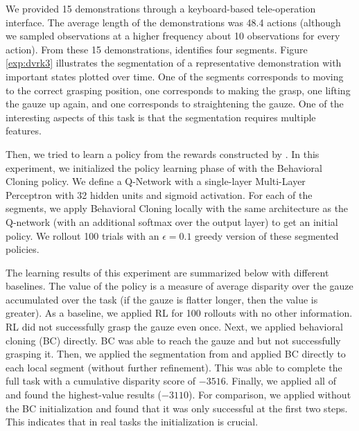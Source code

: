 We provided 15 demonstrations through a keyboard-based tele-operation interface.
The average length of the demonstrations was 48.4 actions (although we sampled observations at a higher frequency about 10 observations for every action).
From these 15 demonstrations, \hirl identifies four segments. Figure \ref{exp:dvrk3} illustrates the segmentation of a representative demonstration with important states plotted over time.
One of the segments corresponds to moving to the correct grasping position, one corresponds to making the grasp, one lifting the gauze up again, and one corresponds to straightening the gauze.
One of the interesting aspects of this task is that the segmentation requires multiple features.

Then, we tried to learn a policy from the rewards constructed by \hirl.
In this experiment, we initialized the policy learning phase of \hirl with the Behavioral Cloning policy.
We define a Q-Network with a single-layer Multi-Layer Perceptron with 32 hidden units and sigmoid activation.
For each of the segments, we apply Behavioral Cloning locally with the same architecture as the Q-network (with an additional softmax over the output layer) to get an initial policy. We rollout 100 trials with an $\epsilon=0.1$ greedy version of these segmented policies.

The learning results of this experiment are summarized below with different baselines.
The value of the policy is a measure of average disparity over the gauze accumulated over the task (if the gauze is flatter longer, then the value is greater).
As a baseline, we applied RL for 100 rollouts with no other information. RL did not successfully grasp the gauze even once.
Next, we applied behavioral cloning (BC) directly.
BC was able to reach the gauze and but not successfully grasping it.
Then, we applied the segmentation from \hirl  and applied BC directly to each local segment (without further refinement). 
This was able to complete the full task with a cumulative disparity score of $-3516$.
Finally, we applied all of \hirl and found the highest-value results ($-3110$).
For comparison, we applied \hirl without the BC initialization and found that it was only successful at the first two steps.
This indicates that in real tasks the initialization is crucial.

